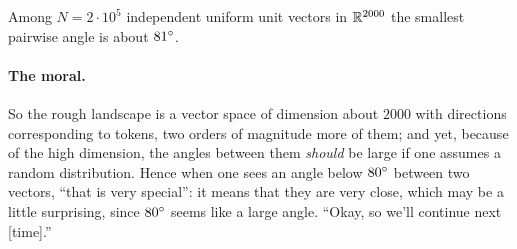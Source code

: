 \begin{claim}\label{cl:L8-min}
Among $N=2\cdot10^{5}$ independent uniform unit vectors in $\mathbb{R}^{2000}$ the smallest pairwise angle is about $81^{\circ}$.
\end{claim}

\paragraph{The moral.}
So the rough landscape is a vector space of dimension about $2000$ with directions corresponding to tokens, two orders of magnitude more of them; and yet, because of the high dimension, the angles between them \emph{should} be large if one assumes a random distribution. Hence when one sees an angle below $80^{\circ}$ between two vectors, ``that is very special'': it means that they are very close, which may be a little surprising, since $80^{\circ}$ seems like a large angle. ``Okay, so we'll continue next [time].''

